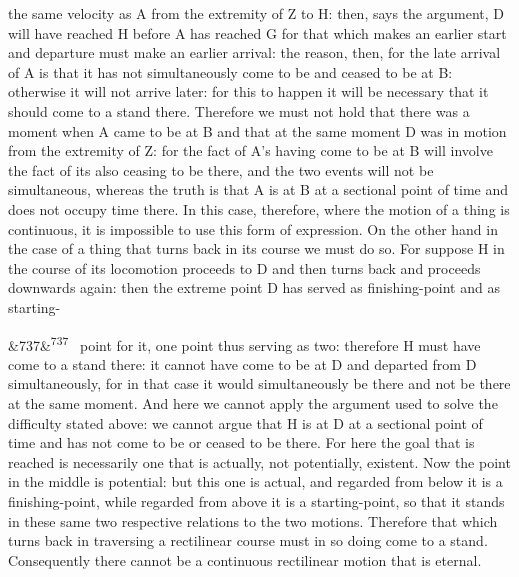 \documentclass[12pt]{article}
\newcommand{\para}[1][]{\par\noindent\ifx&#1&\else\textsuperscript{\footnotesize #1}~\fi}
\begin{document}
the same velocity as A from the extremity of Z to H: then, says the argument, D will have reached H before A has reached G for that which makes an earlier start and departure must make an earlier arrival: the reason, then, for the late arrival of A is that it has not simultaneously come to be and ceased to be at B: otherwise it will not arrive later: for this to happen it will be necessary that it should come to a stand there. Therefore we must not hold that there was a moment when A came to be at B and that at the same moment D was in motion from the extremity of Z: for the fact of A's having come to be at B will involve the fact of its also ceasing to be there, and the two events will not be simultaneous, whereas the truth is that A is at B at a sectional point of time and does not occupy time there. In this case, therefore, where the motion of a thing is continuous, it is impossible to use this form of expression. On the other hand in the case of a thing that turns back in its course we must do so. For suppose H in the course of its locomotion proceeds to D and then turns back and proceeds downwards again: then the extreme point D has served as finishing-point and as starting-

\para[737] point for it, one point thus serving as two: therefore H must have come to a stand there: it cannot have come to be at D and departed from D simultaneously, for in that case it would simultaneously be there and not be there at the same moment. And here we cannot apply the argument used to solve the difficulty stated above: we cannot argue that H is at D at a sectional point of time and has not come to be or ceased to be there. For here the goal that is reached is necessarily one that is actually, not potentially, existent. Now the point in the middle is potential: but this one is actual, and regarded from below it is a finishing-point, while regarded from above it is a starting-point, so that it stands in these same two respective relations to the two motions. Therefore that which turns back in traversing a rectilinear course must in so doing come to a stand. Consequently there cannot be a continuous rectilinear motion that is eternal.
\end{document}

